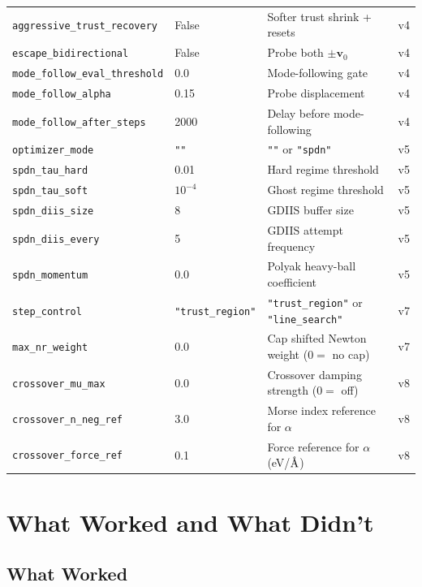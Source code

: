 \documentclass[11pt,a4paper]{article}
\newcommand{\vect}[1]{\mathbf{#1}}
\newcommand{\evec}{\vect{v}}
\newcommand{\angstrom}{\text{\r{A}}}
\begin{document}
\begin{longtable}{llp{7cm}l}
\texttt{aggressive\_trust\_recovery} & False & Softer trust shrink + resets & v4 \\
\texttt{escape\_bidirectional} & False & Probe both $\pm\evec_0$ & v4 \\
\texttt{mode\_follow\_eval\_threshold} & 0.0 & Mode-following gate & v4 \\
\texttt{mode\_follow\_alpha} & 0.15 & Probe displacement & v4 \\
\texttt{mode\_follow\_after\_steps} & 2000 & Delay before mode-following & v4 \\
\midrule
\texttt{optimizer\_mode} & \texttt{""} & \texttt{""} or \texttt{"spdn"} & v5 \\
\texttt{spdn\_tau\_hard} & 0.01 & Hard regime threshold & v5 \\
\texttt{spdn\_tau\_soft} & $10^{-4}$ & Ghost regime threshold & v5 \\
\texttt{spdn\_diis\_size} & 8 & GDIIS buffer size & v5 \\
\texttt{spdn\_diis\_every} & 5 & GDIIS attempt frequency & v5 \\
\texttt{spdn\_momentum} & 0.0 & Polyak heavy-ball coefficient & v5 \\
\midrule
\texttt{step\_control} & \texttt{"trust\_region"} & \texttt{"trust\_region"} or \texttt{"line\_search"} & v7 \\
\texttt{max\_nr\_weight} & 0.0 & Cap shifted Newton weight ($0 =$ no cap) & v7 \\
\midrule
\texttt{crossover\_mu\_max} & 0.0 & Crossover damping strength ($0 =$ off) & v8 \\
\texttt{crossover\_n\_neg\_ref} & 3.0 & Morse index reference for $\alpha$ & v8 \\
\texttt{crossover\_force\_ref} & 0.1 & Force reference for $\alpha$ (eV/$\angstrom$) & v8 \\
\bottomrule
\end{longtable}

\section{What Worked and What Didn't}
\label{sec:what-worked}

\subsection{What Worked}
\end{document}
